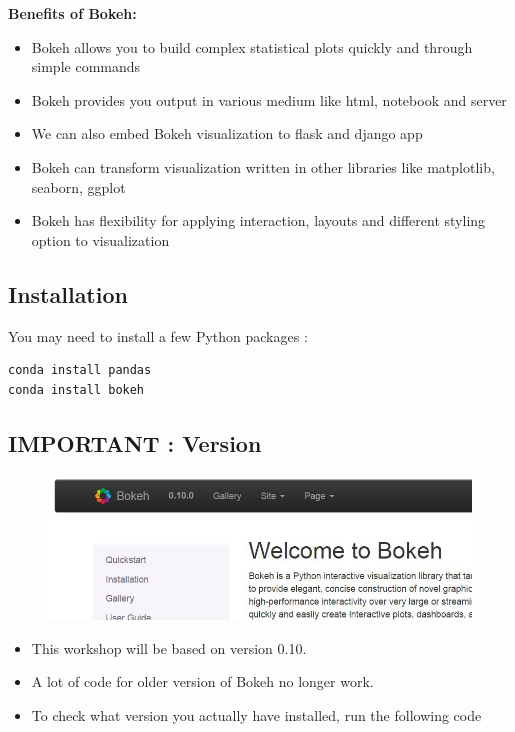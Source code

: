 \documentclass[a4paper,12pt]{article}
\begin{document}
\newpage
\begin{framed}
	\noindent \textbf{Benefits of Bokeh:}
	
	\begin{itemize}
		\item Bokeh allows you to build complex statistical plots quickly and through simple commands
		\item Bokeh provides you output in various medium like html, notebook and server
		\item We can also embed Bokeh visualization to flask and django app
		\item Bokeh can transform visualization written in other libraries like matplotlib, seaborn, ggplot
		\item Bokeh has flexibility for applying interaction, layouts and different styling option to visualization
	\end{itemize}
\end{framed}
\newpage
\subsection*{Installation}
You may need to install a few Python packages :


\begin{framed}
\begin{verbatim}
conda install pandas
conda install bokeh
\end{verbatim}
\end{framed}

\subsection*{IMPORTANT : Version}

\begin{figure}[h!]
\centering
\includegraphics[width=0.7\linewidth]{images/00-BOKEH-version}
\end{figure}
\begin{itemize}
\item This workshop will be based on version 0.10. 
\item A lot of code for older version of Bokeh no longer work.
\item To check what version you actually have installed, run the following code
\end{itemize}
\end{document}
